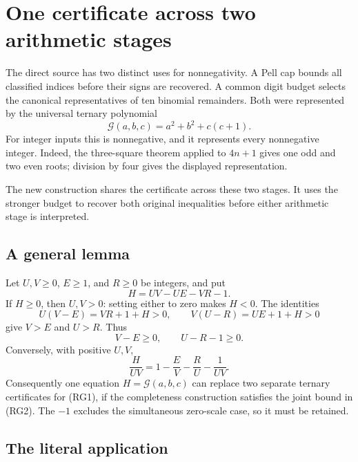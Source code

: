 \section{One certificate across two arithmetic stages}
\label{sec:reciprocal-guard}

The direct source has two distinct uses for nonnegativity. A Pell cap
bounds all classified indices before their signs are recovered. A common
digit budget selects the canonical representatives of ten binomial
remainders. Both were represented by the universal ternary polynomial
\[
 \mathcal G(a,b,c)=a^2+b^2+c(c+1).
\]
For integer inputs this is nonnegative, and it represents every
nonnegative integer. Indeed, the three-square theorem applied to $4n+1$
gives one odd and two even roots; division by four gives the displayed
representation.

The new construction shares the certificate across these two stages.
It uses the stronger budget to recover both original inequalities before
either arithmetic stage is interpreted.

\subsection{A general lemma}

Let $U,V\ge0$, $E\ge1$, and $R\ge0$ be integers, and put
\[
 H=UV-UE-VR-1.
\]
If $H\ge0$, then $U,V>0$: setting either to zero makes $H<0$.
The identities
\[
 U(V-E)=VR+1+H>0,\qquad
 V(U-R)=UE+1+H>0
\]
give $V>E$ and $U>R$. Thus
\[
 V-E\ge0,\qquad U-R-1\ge0.                 \tag{RG1}
\]
Conversely, with positive $U,V$,
\[
 \frac{H}{UV}=1-\frac EV-\frac RU-\frac1{UV}. \tag{RG2}
\]
Consequently one equation $H=\mathcal G(a,b,c)$ can replace two separate
ternary certificates for (RG1), if the completeness construction satisfies
the joint bound in (RG2). The $-1$ excludes the simultaneous zero-scale
case, so it must be retained.

\subsection{The literal application}

